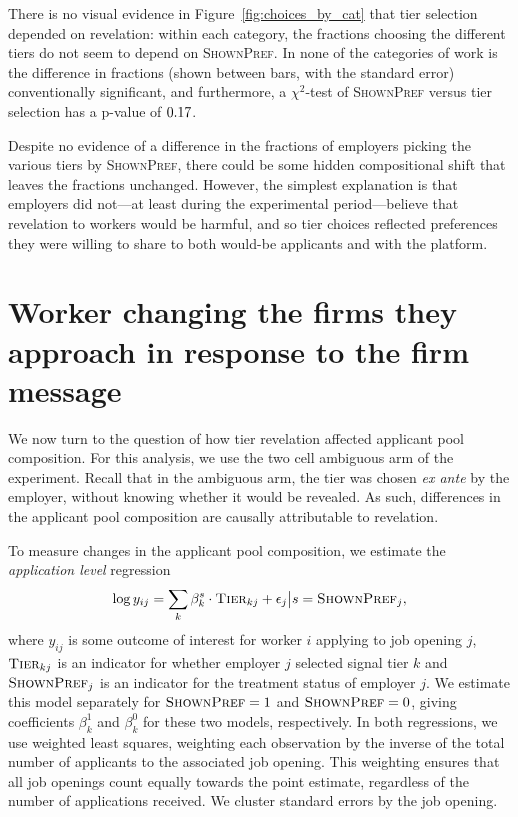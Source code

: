 \documentclass[12pt]{article}
\begin{document}
There is no visual evidence in Figure~\ref{fig:choices_by_cat} that tier selection depended on revelation:
within each category, the fractions choosing the different tiers do not seem to depend on \textsc{ShownPref}.
In none of the categories of work is the difference in fractions (shown between bars, with the standard error) conventionally significant, and furthermore, a $\chi^2$-test of \textsc{ShownPref} versus tier selection has a p-value of $0.17{}$.

Despite no evidence of a difference in the fractions of employers picking the various tiers by \textsc{ShownPref}, there could be some hidden compositional shift that leaves the fractions unchanged.
However, the simplest explanation is that employers did not---at least during the experimental period---believe that revelation to workers would be harmful, and so tier choices reflected preferences they were willing to share to both would-be applicants and with the platform.

\section{Worker changing the firms they approach in response to the firm message} \label{sec:results_sorting}
We now turn to the question of how tier revelation affected applicant pool composition.
For this analysis, we use the two cell ambiguous arm of the experiment.
Recall that in the ambiguous arm, the tier was chosen \emph{ex ante} by the employer, without knowing whether it would be revealed.
As such, differences in the applicant pool composition are causally attributable to revelation.

To measure changes in the applicant pool composition, we estimate the \emph{application level} regression 
\begin{align} \label{eq:app_reg}
 \log y_{ij} = \sum_k \beta^s_k \cdot \textsc{Tier}_{kj} + \epsilon_j \big| s = \textsc{ShownPref}_{j}, 
\end{align}
where $y_{ij}$ is some outcome of interest for worker $i$ applying to job opening $j$, $\textsc{Tier}_{kj}$ is an indicator for whether employer $j$ selected signal tier $k$ and $\textsc{ShownPref}_j$ is an indicator for the treatment status of employer $j$. 
We estimate this model separately for $\textsc{ShownPref} = 1$ and ${\textsc{ShownPref} = 0}$, giving coefficients $\beta^1_k$ and $\beta^0_k$ for these two models, respectively.
In both regressions,  we use weighted least squares, weighting each observation by the inverse of the total number of applicants to the associated job opening.
This weighting ensures that all job openings count equally towards the point estimate, regardless of the number of applications received.
We cluster standard errors by the job opening. 
\end{document}
